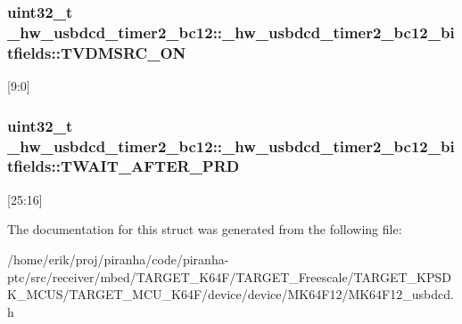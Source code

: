 \subsubsection[{\texorpdfstring{T\+V\+D\+M\+S\+R\+C\+\_\+\+ON}{TVDMSRC_ON}}]{\setlength{\rightskip}{0pt plus 5cm}uint32\+\_\+t \+\_\+hw\+\_\+usbdcd\+\_\+timer2\+\_\+bc12\+::\+\_\+hw\+\_\+usbdcd\+\_\+timer2\+\_\+bc12\+\_\+bitfields\+::\+T\+V\+D\+M\+S\+R\+C\+\_\+\+ON}\hypertarget{struct__hw__usbdcd__timer2__bc12_1_1__hw__usbdcd__timer2__bc12__bitfields_a304c7958819f7c41d2016842c07c1d3f}{}\label{struct__hw__usbdcd__timer2__bc12_1_1__hw__usbdcd__timer2__bc12__bitfields_a304c7958819f7c41d2016842c07c1d3f}
\mbox{[}9\+:0\mbox{]} 
\subsubsection[{\texorpdfstring{T\+W\+A\+I\+T\+\_\+\+A\+F\+T\+E\+R\+\_\+\+P\+RD}{TWAIT_AFTER_PRD}}]{\setlength{\rightskip}{0pt plus 5cm}uint32\+\_\+t \+\_\+hw\+\_\+usbdcd\+\_\+timer2\+\_\+bc12\+::\+\_\+hw\+\_\+usbdcd\+\_\+timer2\+\_\+bc12\+\_\+bitfields\+::\+T\+W\+A\+I\+T\+\_\+\+A\+F\+T\+E\+R\+\_\+\+P\+RD}\hypertarget{struct__hw__usbdcd__timer2__bc12_1_1__hw__usbdcd__timer2__bc12__bitfields_a555a32fe5b6a285d29970cd9532a3ee9}{}\label{struct__hw__usbdcd__timer2__bc12_1_1__hw__usbdcd__timer2__bc12__bitfields_a555a32fe5b6a285d29970cd9532a3ee9}
\mbox{[}25\+:16\mbox{]} 

The documentation for this struct was generated from the following file\+:\begin{DoxyCompactItemize}
\item 
/home/erik/proj/piranha/code/piranha-\/ptc/src/receiver/mbed/\+T\+A\+R\+G\+E\+T\+\_\+\+K64\+F/\+T\+A\+R\+G\+E\+T\+\_\+\+Freescale/\+T\+A\+R\+G\+E\+T\+\_\+\+K\+P\+S\+D\+K\+\_\+\+M\+C\+U\+S/\+T\+A\+R\+G\+E\+T\+\_\+\+M\+C\+U\+\_\+\+K64\+F/device/device/\+M\+K64\+F12/M\+K64\+F12\+\_\+usbdcd.\+h\end{DoxyCompactItemize}
